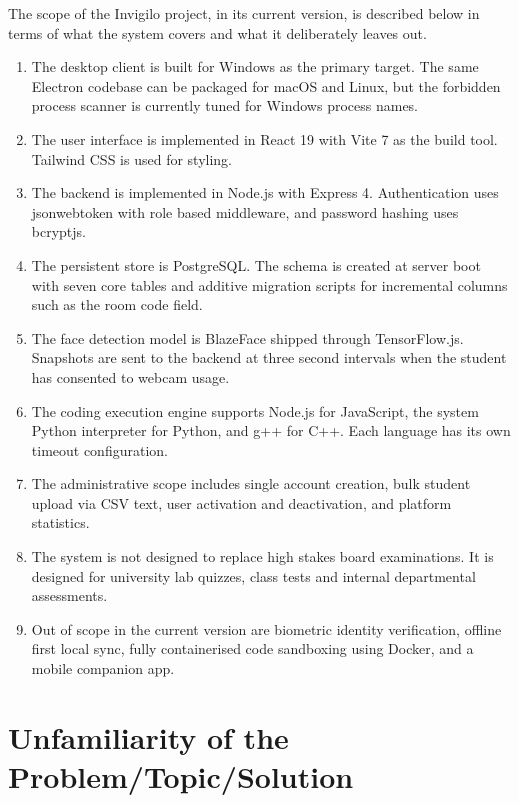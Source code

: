 \documentclass[12pt, a4paper]{report}
\begin{document}
\begin{justify}
  {\fontsize{12}{18}\selectfont
    The scope of the Invigilo project, in its current version, is described below in terms of what the system covers and what it deliberately leaves out.

    \begin{enumerate}
        \item The desktop client is built for Windows as the primary target. The same Electron codebase can be packaged for macOS and Linux, but the forbidden process scanner is currently tuned for Windows process names.
        \item The user interface is implemented in React 19 with Vite 7 as the build tool. Tailwind CSS is used for styling.
        \item The backend is implemented in Node.js with Express 4. Authentication uses jsonwebtoken with role based middleware, and password hashing uses bcryptjs.
        \item The persistent store is PostgreSQL. The schema is created at server boot with seven core tables and additive migration scripts for incremental columns such as the room code field.
        \item The face detection model is BlazeFace shipped through TensorFlow.js. Snapshots are sent to the backend at three second intervals when the student has consented to webcam usage.
        \item The coding execution engine supports Node.js for JavaScript, the system Python interpreter for Python, and g++ for C++. Each language has its own timeout configuration.
        \item The administrative scope includes single account creation, bulk student upload via CSV text, user activation and deactivation, and platform statistics.
        \item The system is not designed to replace high stakes board examinations. It is designed for university lab quizzes, class tests and internal departmental assessments.
        \item Out of scope in the current version are biometric identity verification, offline first local sync, fully containerised code sandboxing using Docker, and a mobile companion app.
    \end{enumerate}
  }
\end{justify}

\section{Unfamiliarity of the Problem/Topic/Solution}
\end{document}
